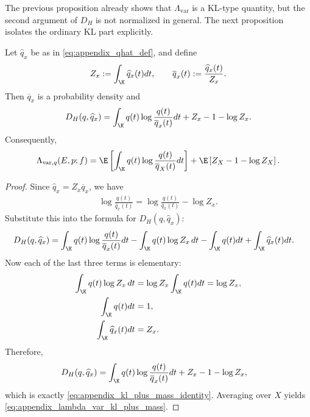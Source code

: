 The previous proposition already shows that $\Lambda_{\mathrm{var}}$ is a KL-type quantity, but the second argument of $D_H$ is not normalized in general.
The next proposition isolates the ordinary KL part explicitly.

\begin{proposition}
\label{prop:appendix_normalized_kl_decomposition}
Let $\widehat q_x$ be as in \eqref{eq:appendix_qhat_def}, and define
\begin{align}
    Z_x := \int_\K \widehat q_x(t)dt,
    \qquad
    \overline q_x(t) := \frac{\widehat q_x(t)}{Z_x}.
    \label{eq:appendix_normalization_def}
\end{align}
Then $\overline q_x$ is a probability density and
\begin{align}
    D_H(q,\widehat q_x)
    =
    \int_\K q(t)\log\frac{q(t)}{\overline q_x(t)}dt
    + Z_x - 1 - \log Z_x.
    \label{eq:appendix_kl_plus_mass_identity}
\end{align}
Consequently,
\begin{align}
    \Lambda_{\mathrm{var}, q}(E, p; f)
    =
    \E\left[\int_\K q(t)\log\frac{q(t)}{\overline q_X(t)}dt\right]
    + \E\left[Z_X - 1 - \log Z_X\right].
    \label{eq:appendix_lambda_var_kl_plus_mass}
\end{align}
\end{proposition}

\begin{proof}
Since $\widehat q_x = Z_x\overline q_x$, we have
\begin{align*}
    \log\frac{q(t)}{\widehat q_x(t)}
    = \log\frac{q(t)}{\overline q_x(t)} - \log Z_x.
\end{align*}
Substitute this into the formula for $D_H(q,\widehat q_x)$:
\begin{align*}
    D_H(q,\widehat q_x)
     & = \int_\K q(t)\log\frac{q(t)}{\overline q_x(t)}dt - \int_\K q(t)\log Z_x\,dt - \int_\K q(t)dt + \int_\K \widehat q_x(t)dt.
\end{align*}
Now each of the last three terms is elementary:
\begin{align*}
    \int_\K q(t)\log Z_x\,dt
     & = \log Z_x \int_\K q(t)dt
    = \log Z_x, \\
    \int_\K q(t)dt
     & = 1, \\
    \int_\K \widehat q_x(t)dt
     & = Z_x.
\end{align*}
Therefore,
\begin{align*}
    D_H(q,\widehat q_x)
     & = \int_\K q(t)\log\frac{q(t)}{\overline q_x(t)}dt + Z_x - 1 - \log Z_x,
\end{align*}
which is exactly \eqref{eq:appendix_kl_plus_mass_identity}. Averaging over $X$ yields
\eqref{eq:appendix_lambda_var_kl_plus_mass}.
\end{proof}

